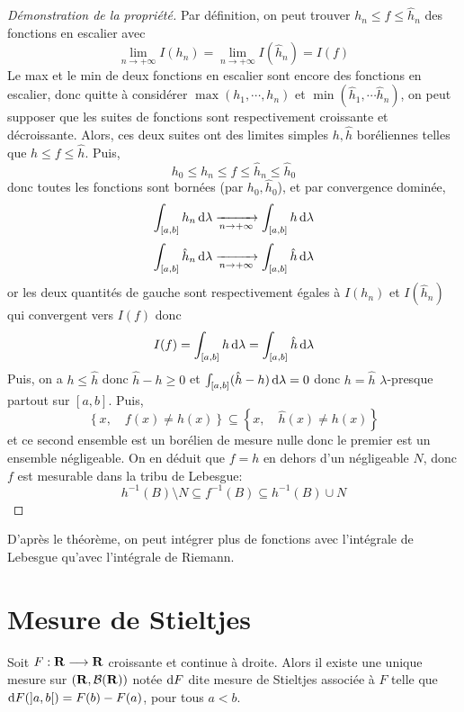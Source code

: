 \begin{proof}[Démonstration de la propriété]
Par définition, on peut trouver $h_n \leq f\leq \hat{h}_n$ des fonctions en escalier avec \[
    \lim_{n\to +\infty} I(h_n)=\lim_{n\to +\infty} I(\hat{h}_n)=I(f)
\] 
Le max et le min de deux fonctions en escalier sont encore des fonctions en escalier, donc quitte à considérer $\max(h_1, \cdots , h_n)$ et $\min (\hat{h}_1, \cdots \hat{h}_n)$, on peut supposer que les suites de fonctions sont respectivement croissante et décroissante. Alors, ces deux suites ont des limites simples $h, \hat{h}$ boréliennes telles que $h\leq f\leq \hat{h}$. Puis, \[
h_0\leq h_n\leq f\leq \hat{h}_n\leq \hat{h}_0
\] 
donc toutes les fonctions sont bornées (par $h_0, \hat{h}_0$), et par convergence dominée, \[
    \int_{[a, b]}h_n\mathop{}\!\mathrm d \lambda \xrightarrow[n\to+\infty]{}\int_{[a, b]}h\mathop{}\!\mathrm d \lambda
\]
\[

    \int_{[a, b]}\hat{h}_n\diff \lambda \xrightarrow[n\to+\infty]{}\int_{[a, b]}\hat{h}\diff \lambda
\] 
or les deux quantités de gauche sont respectivement égales à  $I(h_n)$ et  $I(\hat{h}_n)$ qui convergent vers $I(f)$ donc  \[
    I(f)= \int_{[a,b]} h\mathop{}\!\mathrm d \lambda=\int_{[a, b]}\hat{h}\mathop{}\!\mathrm d \lambda
\]
Puis, on a $h\leq \hat{h}$ donc $\hat{h}-h\geq 0$ et $\int_{[a, b]}(\hat{h}-h)\mathop{}\!\mathrm d \lambda=0$ donc $h=\hat{h}$ $\lambda$-presque partout sur $[a, b]$. Puis, \[ \left\{ x , \quad  f(x)\neq h(x) \right\} \subseteq \left\{ x, \quad  \hat{h}(x) \neq  h(x) \right\} \] et ce second ensemble est un borélien de mesure nulle donc le premier est un ensemble négligeable. On en déduit que $f=h$ en dehors d'un négligeable  $N$, donc  $f$ est mesurable dans la tribu de Lebesgue:  \[
h^{-1}(B)\setminus  N \subseteq f^{-1} (B) \subseteq h^{-1}(B)\cup N
\] 
\end{proof}

\begin{rem}
D'après le théorème, on peut intégrer plus de fonctions avec l'intégrale de Lebesgue qu'avec l'intégrale de Riemann.
\end{rem}

\section{Mesure de Stieltjes}

\begin{prop}
    Soit $F: \mathbf R \longrightarrow \mathbf R$ croissante et continue à droite. Alors il existe une unique mesure sur $(\mathbf R, \mathcal  B(\mathbf R))$ notée $\mathop{}\!\mathrm d F$ dite mesure de Stieltjes associée à  $F$ telle que  $\mathop{}\!\mathrm d F(]a, b[)=F(b)-F(a)$, pour tous  $a<b$.
\end{prop}

